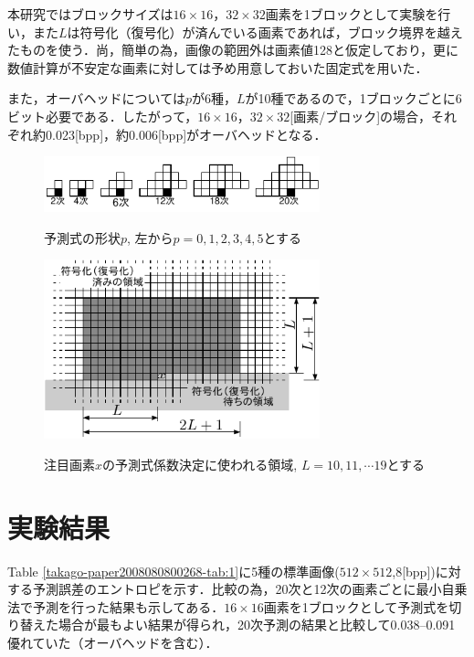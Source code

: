 \documentclass[10pt,dvipdfmx]{jsarticle}
\begin{document}
本研究ではブロックサイズは$16\times16$，$32\times32$画素を1ブロックとして実験を行い，また$L$は符号化（復号化）が済んでいる画素であれば，ブロック境界を越えたものを使う．尚，簡単の為，画像の範囲外は画素値128と仮定しており，更に数値計算が不安定な画素に対しては予め用意しておいた固定式を用いた．

また，オーバヘッドについては$p$が6種，$L$が10種であるので，1ブロックごとに6ビット必要である．したがって，$16\times 16$，$32\times 32$[画素/ブロック]の場合，それぞれ約0.023[bpp]，約0.006[bpp]がオーバヘッドとなる．
\begin{figure}[t]
   \begin{center}
    \vspace{2mm}
   \includegraphics[width=80mm]{fig/fig1.pdf}
   \caption{予測式の形状$p$, 左から$p=0,1,2,3,4,5$とする}
   \label{takago-paper2008080800268-fig:1}
%
   \vspace{2mm}
\includegraphics[width=80mm]{fig/fig2.pdf}
\caption{注目画素$x$の予測式係数決定に使われる領域, $L=10,11,\cdots19$とする}
\label{takago-paper2008080800268-fig:2}
   \end{center}
\end{figure}
\section{実験結果}
Table \ref{takago-paper2008080800268-tab:1}に5種の標準画像($512\times512$,8[bpp])に対する予測誤差のエントロピを示す．比較の為，20次と12次の画素ごとに最小自乗法で予測を行った結果も示してある．$16\times 16$画素を1ブロックとして予測式を切り替えた場合が最もよい結果が得られ，20次予測の結果と比較して0.038--0.091優れていた（オーバヘッドを含む）．
\end{document}
